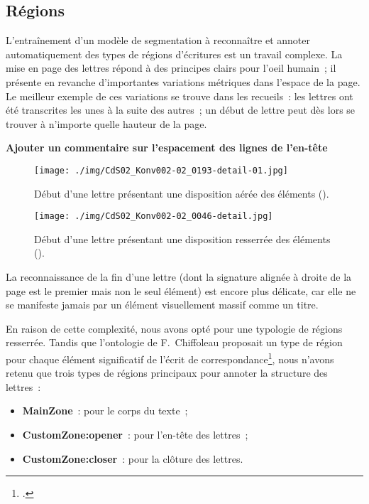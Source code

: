\documentclass[a4paper,12pt,twoside]{book}
\begin{document}
			\subsection{Régions}
				L'entraînement d'un modèle de \gls{segmentation} à reconnaître et annoter automatiquement des types de régions d'écritures est un travail complexe. La mise en page des lettres répond à des principes clairs pour l'oeil humain~; il présente en revanche d'importantes variations métriques dans l'espace de la page. Le meilleur exemple de ces variations se trouve dans les recueils~: les lettres ont été transcrites les unes à la suite des autres~; un début de lettre peut dès lors se trouver à n'importe quelle hauteur de la page. 
				
				\textbf{Ajouter un commentaire sur l'espacement des lignes de l'en-tête}
				
				\begin{figure}[!h]
					\centering
					\texttt{[image: ./img/CdS02\_Konv002-02\_0193-detail-01.jpg]}%
					\caption{Début d'une lettre présentant une disposition aérée des éléments (\cite{salmCorrespondanceGeneraleSeconde}).}%
					\label{}%
				\end{figure}
			
				\begin{figure}[!h]
					\centering
					\texttt{[image: ./img/CdS02\_Konv002-02\_0046-detail.jpg]}%
					\caption{Début d'une lettre présentant une disposition resserrée des éléments (\cite{salmCorrespondanceGeneraleSeconde}).}%
					\label{}%
				\end{figure}
				
				La reconnaissance de la fin d'une lettre (dont la signature alignée à droite de la page est le premier mais non le seul élément) est encore plus délicate, car elle ne se manifeste jamais par un élément visuellement massif comme un titre.
				
				En raison de cette complexité, nous avons opté pour une typologie de régions resserrée. Tandis que l'ontologie de F.~Chiffoleau proposait un type de région pour chaque élément significatif de l'écrit de correspondance\footcite{chiffoleauCorrespondanceLangueFrancaise2021}, nous n'avons retenu que trois types de régions principaux pour annoter la structure des lettres~:
				
				\begin{itemize}
					\item \textbf{MainZone}~: pour le corps du texte~;
					\item \textbf{CustomZone:opener}~: pour l'en-tête des lettres~;
					\item \textbf{CustomZone:closer}~: pour la clôture des lettres.
				\end{itemize}
			
\end{document}
